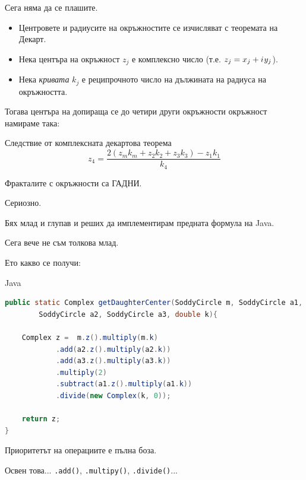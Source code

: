 \documentclass[xcolor=x11names,compress]{beamer}
\renewcommand{\(}{\begin{columns}}
\renewcommand{\)}{\end{columns}}
\newcommand{\<}[1]{\begin{column}{#1}}
\renewcommand{\>}{\end{column}}
\begin{document}
\begin{frame}
  Сега няма да се плашите.

  \pause
  \begin{itemize}[<+->]
  \item Центровете и радиусите на окръжностите се изчисляват с теоремата на Декарт.
  \item Нека центъра на окръжност $z_j$ е комплексно число (т.е. $z_j = x_j + i\mkern1mu y_j$).
  \item Нека \emph{кривата} $k_j$ е реципрочното число на дължината на радиуса на окръжността.
  \end{itemize}

  \pause
  Тогава центъра на допираща се до четири други окръжности окръжност намираме така:
  \begin{block}{Следствие от комплексната декартова теорема}
    \[
    z_4 = \frac{2 (z_m k_m + z_2 k_2 + z_3 k_3) - z_1 k_1}{k_4}
    \]
  \end{block}
\end{frame}

\begin{frame}
  \begin{center}
    Фракталите с окръжности са ГАДНИ.

    \pause
    Сериозно.
  \end{center}
\end{frame}

\begin{frame}[fragile]
  Бях млад и глупав и реших да имплементирам предната формула на Java.

  \pause
  Сега вече не съм толкова млад.

  \pause
  Ето какво се получи:

  \pause
  \begin{block}{Java}
    \begin{lstlisting}[language=Java,basicstyle=\tiny]
public static Complex getDaughterCenter(SoddyCircle m, SoddyCircle a1,
        SoddyCircle a2, SoddyCircle a3, double k){
   
    Complex z =  m.z().multiply(m.k)
            .add(a2.z().multiply(a2.k))
            .add(a3.z().multiply(a3.k))
            .multiply(2)
            .subtract(a1.z().multiply(a1.k))
            .divide(new Complex(k, 0));
   
    return z;
}
    \end{lstlisting}
  \end{block}

  \pause
  Приоритетът на операциите е пълна боза.

  \pause
  Освен това... \texttt{.add()}, \texttt{.multipy()}, \texttt{.divide()}...
\end{frame}
\end{document}
